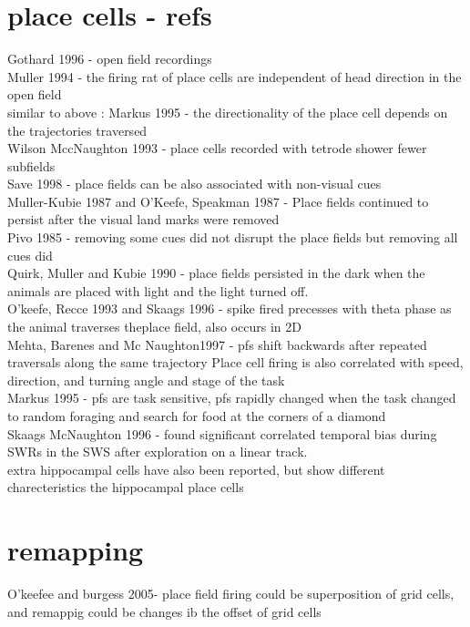 \documentclass{article}
\begin{document}
\section*{place cells - refs}
Gothard 1996 - open field recordings \\
Muller 1994 - the firing rat of place cells are independent of head direction in the open field\\
similar to above : Markus 1995 - the directionality of the place cell depends on the trajectories traversed\\
Wilson MccNaughton 1993 - place cells recorded with tetrode shower fewer subfields\\
Save 1998 - place fields can be also associated with non-visual cues\\
Muller-Kubie 1987 and O'Keefe, Speakman 1987 - Place fields continued to persist after the visual land marks were removed \\
Pivo 1985 - removing some cues did not disrupt the place fields but removing all cues did\\
Quirk, Muller and Kubie 1990 - place fields persisted in the dark when the animals are placed with light and the light turned off.\\
O'keefe, Recce 1993 and Skaags 1996 - spike fired precesses with theta phase as the animal traverses theplace field, also occurs in 2D\\
Mehta, Barenes and Mc Naughton1997 - pfs shift backwards after repeated traversals along the same trajectory 
Place cell firing is also correlated with speed, direction, and turning angle  and stage of the task \\
Markus 1995 - pfs are task sensitive, pfs rapidly changed when the task changed to random foraging and search for food at the corners of a diamond\\
Skaags McNaughton 1996 - found significant correlated temporal bias during SWRs in the SWS after exploration on a linear track.\\
extra hippocampal cells have also been reported, but show different charecteristics the hippocampal place cells\\





\section*{remapping}
O'keefee and burgess 2005- place field firing could be superposition of grid cells, and remappig could be changes ib the offset of grid cells
\end{document}
